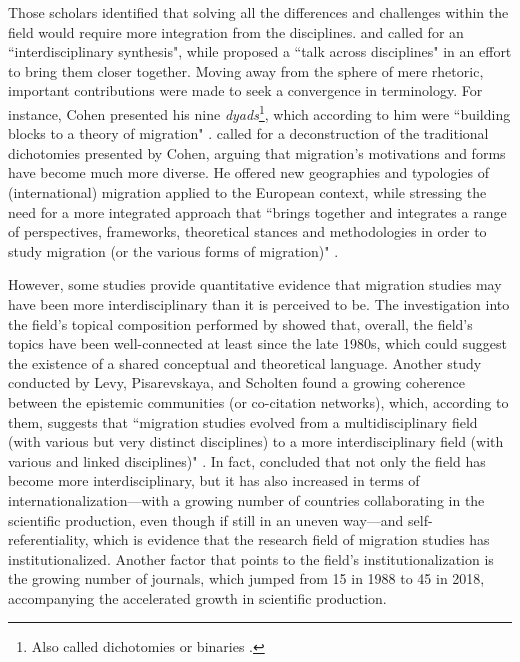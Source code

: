 Those scholars identified that solving all the differences and challenges within the field would require more integration from the disciplines. \cite{king_towards_2002} and \cite{king_theories_2012} called for an ``interdisciplinary synthesis", while \cite{brettell_introduction_2015} proposed a ``talk across disciplines" in an effort to bring them closer together. Moving away from the sphere of mere rhetoric, important contributions were made to seek a convergence in terminology. For instance, Cohen presented his nine \textit{dyads}\footnote{Also called dichotomies or binaries \citep{king_theories_2012}.}, which according to him were ``building blocks to a theory of migration" \citep[p. xvi]{cohen_introduction_1996}. \cite{king_towards_2002} called for a deconstruction of the traditional dichotomies presented by Cohen, arguing that migration's motivations and forms have become much more diverse. He offered new geographies and typologies of (international) migration applied to the European context, while stressing the need for a more integrated approach that ``brings together and integrates a range of perspectives, frameworks, theoretical stances and methodologies in order to study migration (or the various forms of migration)" \citep[p. 90]{king_towards_2002}.

However, some studies provide quantitative evidence that migration studies may have been more interdisciplinary than it is perceived to be. The investigation into the field's topical composition performed by \cite{pisarevskaya_mapping_2020} showed that, overall, the field's topics have been well-connected at least since the late 1980s, which could suggest the existence of a shared conceptual and theoretical language. Another study conducted by Levy, Pisarevskaya, and Scholten found a growing coherence between the epistemic communities (or co-citation networks), which, according to them, suggests that ``migration studies evolved from a multidisciplinary field (with various but very distinct disciplines) to a more interdisciplinary field (with various and linked disciplines)" \citep[p. 22-23]{levy_between_2020}. In fact, \cite{levy_between_2020} concluded that not only the field has become more interdisciplinary, but it has also increased in terms of internationalization---with a growing number of countries collaborating in the scientific production, even though if still in an uneven way---and self-referentiality, which is evidence that the research field of migration studies has institutionalized. Another factor that points to the field's institutionalization is the growing number of journals, which jumped from 15 in 1988 to 45 in 2018, accompanying the accelerated growth in scientific production.

